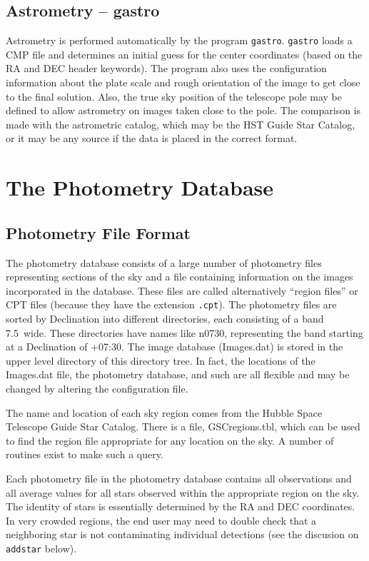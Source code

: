 \documentclass{article}
\begin{document}
\subsection{Astrometry -- gastro}

Astrometry is performed automatically by the program {\tt gastro}.
{\tt gastro} loads a CMP file and determines an initial guess for the
center coordinates (based on the RA and DEC header keywords).  The
program also uses the configuration information about the plate scale
and rough orientation of the image to get close to the final solution.
Also, the true sky position of the telescope pole may be defined to
allow astrometry on images taken close to the pole.  The comparison is
made with the astrometric catalog, which may be the HST Guide Star
Catalog, or it may be any source if the data is placed in the correct
format.

\section{The Photometry Database}

\subsection{Photometry File Format}
The photometry database consists of a large number of photometry files
representing sections of the sky and a file containing information on
the images incorporated in the database.  These files are called
alternatively ``region files'' or CPT files (because they have the
extension {\tt .cpt}).  The photometry files are sorted by Declination
into different directories, each consisting of a band 7.5\degree\ 
wide.  These directories have names like n0730, representing the band
starting at a Declination of +07:30.  The image database (Images.dat)
is stored in the upper level directory of this directory tree.  In
fact, the locations of the Images.dat file, the photometry database,
and such are all flexible and may be changed by altering the
configuration file.

The name and location of each sky region comes from the Hubble Space
Telescope Guide Star Catalog.  There is a file, GSCregions.tbl, which
can be used to find the region file appropriate for any location on
the sky.  A number of routines exist to make such a query.  

Each photometry file in the photometry database contains all
observations and all average values for all stars observed within the
appropriate region on the sky.  The identity of stars is essentially
determined by the RA and DEC coordinates.  In very crowded regions,
the end user may need to double check that a neighboring star is not
contaminating individual detections (see the discusion on {\tt
  addstar} below).
\end{document}
